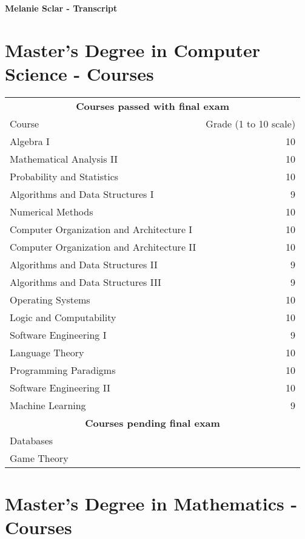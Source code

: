 \documentclass [a4paper, 10pt]{article}
\begin{document}
\begin{center}
	{\LARGE \textbf{Melanie Sclar - Transcript}}
\end{center}
\bigskip
\section{Master's Degree in Computer Science - Courses}

\begin{table}[!h]
\centering
\begin{tabular}{l r}
\multicolumn{2}{c}{\textbf{Courses passed with final exam}} \\
Course & Grade (1 to 10 scale) \\
\hline
Algebra I & 10 \\
Mathematical Analysis II & 10 \\
Probability and Statistics & 10 \\
Algorithms and Data Structures I & 9 \\
Numerical Methods & 10 \\
Computer Organization and Architecture I & 10 \\
Computer Organization and Architecture II & 10 \\ 
Algorithms and Data Structures II & 9 \\
Algorithms and Data Structures III & 9 \\
Operating Systems & 10 \\ 
Logic and Computability & 10 \\
Software Engineering I & 9 \\
Language Theory & 10 \\
Programming Paradigms & 10 \\
Software Engineering II & 10 \\
Machine Learning & 9 \\

\hline
\multicolumn{2}{c}{\textbf{Courses pending final exam} } \\
Databases \\ 
Game Theory \\
\end{tabular}
\end{table}

\bigskip


\section{Master's Degree in Mathematics - Courses}
\end{document}
